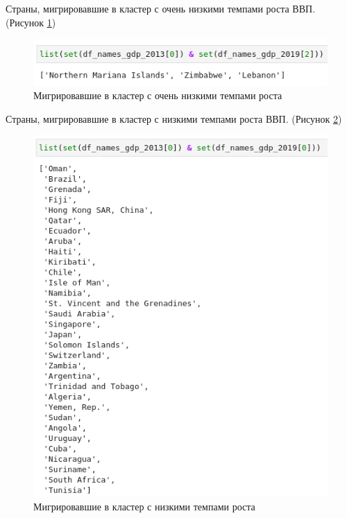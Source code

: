 \documentclass[14pt,fleqn]{extarticle}
\begin{document}
	Страны, мигрировавшие в кластер с очень низкими темпами роста ВВП. (Рисунок \ref{fig:cluster_mean_very_low})

	\begin{figure}[h]
		\centering \includegraphics[scale=0.5]{cluster_mean_very_low}
		\caption{Мигрировавшие в кластер с очень низкими темпами роста}
		\label{fig:cluster_mean_very_low}
	\end{figure}

	\newpage
	
	Страны, мигрировавшие в кластер с низкими темпами роста ВВП. (Рисунок \ref{fig:cluster_mean_low})
	
	\begin{figure}[h]
		\centering \includegraphics[scale=0.45]{cluster_mean_low}
		\caption{Мигрировавшие в кластер с низкими темпами роста}
		\label{fig:cluster_mean_low}
	\end{figure}
\end{document}
